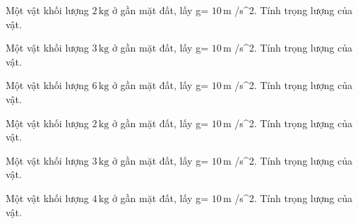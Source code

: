 \begin{ex}
Một vật khối lượng $2\,\text{kg}$ ở gần mặt đất, lấy g= $10\,\text{m}$ /s^2. Tính trọng lượng của vật.
\end{ex}

\begin{ex}
Một vật khối lượng $3\,\text{kg}$ ở gần mặt đất, lấy g= $10\,\text{m}$ /s^2. Tính trọng lượng của vật.
\end{ex}

\begin{bt}
Một vật khối lượng $6\,\text{kg}$ ở gần mặt đất, lấy g= $10\,\text{m}$ /s^2. Tính trọng lượng của vật.
\end{bt}

\begin{bt}
Một vật khối lượng $2\,\text{kg}$ ở gần mặt đất, lấy g= $10\,\text{m}$ /s^2. Tính trọng lượng của vật.
\end{bt}

\begin{bt}
Một vật khối lượng $3\,\text{kg}$ ở gần mặt đất, lấy g= $10\,\text{m}$ /s^2. Tính trọng lượng của vật.
\end{bt}

\begin{bt}
Một vật khối lượng $4\,\text{kg}$ ở gần mặt đất, lấy g= $10\,\text{m}$ /s^2. Tính trọng lượng của vật.
\end{bt}

